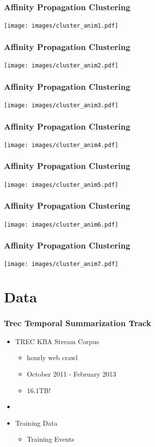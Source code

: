 \documentclass{beamer}
\begin{document}
\begin{frame}
\frametitle{Affinity Propagation Clustering}
    \texttt{[image: images/cluster\_anim1.pdf]}
\end{frame}
\begin{frame}
\frametitle{Affinity Propagation Clustering}
    \texttt{[image: images/cluster\_anim2.pdf]}
\end{frame}
\begin{frame}
\frametitle{Affinity Propagation Clustering}
    \texttt{[image: images/cluster\_anim3.pdf]}
\end{frame}
\begin{frame}
\frametitle{Affinity Propagation Clustering}
    \texttt{[image: images/cluster\_anim4.pdf]}
\end{frame}
\begin{frame}
\frametitle{Affinity Propagation Clustering}
    \texttt{[image: images/cluster\_anim5.pdf]}
\end{frame}
\begin{frame}
\frametitle{Affinity Propagation Clustering}
    \texttt{[image: images/cluster\_anim6.pdf]}
\end{frame}
\begin{frame}
\frametitle{Affinity Propagation Clustering}
    \texttt{[image: images/cluster\_anim7.pdf]}
\end{frame}

\section{Data}

\begin{frame}
\frametitle{Trec Temporal Summarization Track}
\begin{itemize}
\pause
\item TREC KBA Stream Corpus
\pause
\begin{itemize}
\item hourly web crawl
\item October 2011 - February 2013
\item 16.1TB!
\end{itemize}
\pause
\item[]
\item Training Data
\begin{itemize}
\item Training Events
\end{itemize}
\end{itemize}
\end{frame}
\end{document}
